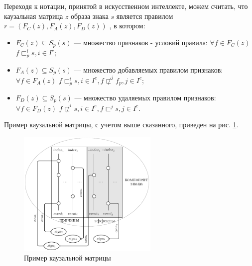 \documentclass[12pt]{scrartcl}
\begin{document}
	Переходя к нотации, принятой в искусственном интеллекте, можем считать, что каузальная матрица $z$ образа знака $s$ является правилом $r=(F_C(z),F_A(z),F_D(z))$ \cite{Osipov2008b}, в котором:
	\begin{itemize}
		\item $F_C (z)\subseteq S_p(s)$ --- множество признаков - условий правила: $\forall f\in F_C(z)$ $f\sqsubset_p^i s, i\in I^c$;
		
		\item $F_A(z)\subseteq S_p(s)$ --- множество добавляемых правилом признаков: $\forall f\in F_A(z)$ $f\sqsubset_p^i s,i\in I^e, f\not\sqsubset^j f_p, j\in I^c$;
		
		\item $F_D(z)\subseteq S_p(s)$ --- множество удаляемых правилом признаков: $\forall f\in F_D(z)$ $f\not\sqsubset^i s, i\in I^e,f\sqsubset^j s, j\in I^c$.
	\end{itemize}

	Пример каузальной матрицы, с учетом выше сказанного, приведен на рис. \ref{fig:caus_matr}.

	\begin{figure}[H]
		\centering
		\includegraphics[width=0.6\textwidth]{causnet/caus_matr_ru}
		\caption{Пример каузальной матрицы}	
		\label{fig:caus_matr}	
	\end{figure}	
	
\end{document}
